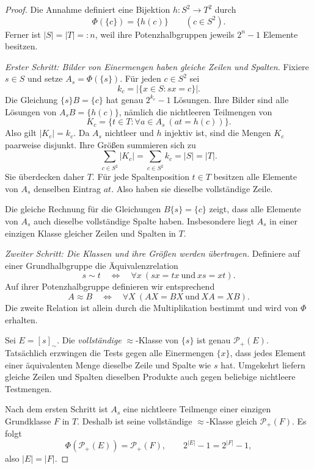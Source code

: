 \documentclass[a4paper,11pt]{article}
\newcommand{\Pp}[1]{\mathcal P_+(#1)}
\begin{document}
\begin{proof}
Die Annahme definiert eine Bijektion \(h:S^2\to T^2\) durch
\[
 \Phi(\{c\})=\{h(c)\}\qquad(c\in S^2).
\]
Ferner ist \(|S|=|T|=:n\), weil ihre Potenzhalbgruppen jeweils
\(2^n-1\) Elemente besitzen.

\emph{Erster Schritt: Bilder von Einermengen haben gleiche Zeilen und
Spalten.} Fixiere \(s\in S\) und setze \(A_s=\Phi(\{s\})\).
Für jeden \(c\in S^2\) sei
\[
 k_c=|\{x\in S:sx=c\}|.
\]
Die Gleichung \(\{s\}B=\{c\}\) hat genau \(2^{k_c}-1\)
Lösungen. Ihre Bilder sind alle Lösungen von
\(A_sB=\{h(c)\}\), nämlich die nichtleeren Teilmengen von
\[
 K_c=\{t\in T:\forall a\in A_s\ (at=h(c))\}.
\]
Also gilt \(|K_c|=k_c\). Da \(A_s\) nichtleer und \(h\)
injektiv ist, sind die Mengen \(K_c\) paarweise disjunkt. Ihre
Größen summieren sich zu
\[
 \sum_{c\in S^2}|K_c|=\sum_{c\in S^2}k_c=|S|=|T|.
\]
Sie überdecken daher \(T\). Für jede Spaltenposition \(t\in T\)
besitzen alle Elemente von \(A_s\) denselben Eintrag \(at\).
Also haben sie dieselbe vollständige Zeile.

Die gleiche Rechnung für die Gleichungen \(B\{s\}=\{c\}\)
zeigt, dass alle Elemente von \(A_s\) auch dieselbe vollständige
Spalte haben. Insbesondere liegt \(A_s\) in einer einzigen Klasse
gleicher Zeilen und Spalten in \(T\).

\emph{Zweiter Schritt: Die Klassen und ihre Größen werden übertragen.}
Definiere auf einer Grundhalbgruppe die Äquivalenzrelation
\[
 s\sim t\quad\Longleftrightarrow\quad
 \forall x\ (sx=tx\ \text{und}\ xs=xt).
\]
Auf ihrer Potenzhalbgruppe definieren wir entsprechend
\[
 A\approx B\quad\Longleftrightarrow\quad
 \forall X\ (AX=BX\ \text{und}\ XA=XB).
\]
Die zweite Relation ist allein durch die Multiplikation bestimmt und
wird von \(\Phi\) erhalten.

Sei \(E=[s]_\sim\). Die \emph{vollständige} \(\approx\)-Klasse
von \(\{s\}\) ist genau \(\Pp E\). Tatsächlich erzwingen die
Tests gegen alle Einermengen \(\{x\}\), dass jedes Element einer
äquivalenten Menge dieselbe Zeile und Spalte wie \(s\) hat.
Umgekehrt liefern gleiche Zeilen und Spalten dieselben Produkte auch
gegen beliebige nichtleere Testmengen.

Nach dem ersten Schritt ist \(A_s\) eine nichtleere Teilmenge einer
einzigen Grundklasse \(F\) in \(T\). Deshalb ist seine vollständige
\(\approx\)-Klasse gleich \(\Pp F\). Es folgt
\begin{equation}\label{tw:class-match}
 \Phi(\Pp E)=\Pp F,\qquad
 2^{|E|}-1=2^{|F|}-1,
\end{equation}
also \(|E|=|F|\).


\end{proof}
\end{document}
